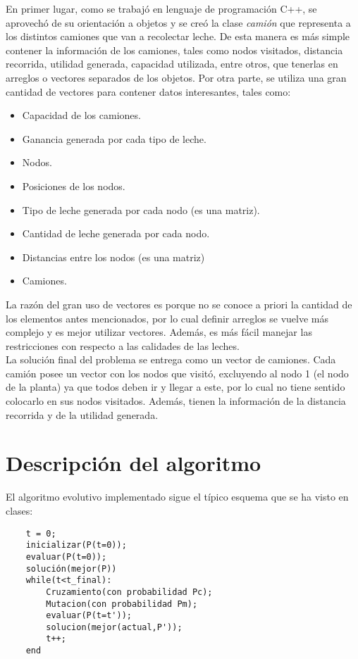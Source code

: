 \documentclass[letter, 10pt]{article}
\begin{document}
En primer lugar, como se trabajó en lenguaje de programación C++, se aprovechó de su orientación a objetos y se creó la clase \textit{camión} que representa a los distintos camiones que van a recolectar leche. De esta manera es más simple contener la información de los camiones, tales como nodos visitados, distancia recorrida, utilidad generada, capacidad utilizada, entre otros, que tenerlas en arreglos o vectores separados de los objetos. Por otra parte, se utiliza una gran cantidad de vectores para contener datos interesantes, tales como:

\begin{itemize}
    \item Capacidad de los camiones.
    \item Ganancia generada por cada tipo de leche.
    \item Nodos.
    \item Posiciones de los nodos.
    \item Tipo de leche generada por cada nodo (es una matriz).
    \item Cantidad de leche generada por cada nodo.
    \item Distancias entre los nodos (es una matriz)
    \item Camiones.
\end{itemize}

La razón del gran uso de vectores es porque no se conoce a priori la cantidad de los elementos antes mencionados, por lo cual definir arreglos se vuelve más complejo y es mejor utilizar vectores. Además, es más fácil manejar las restricciones con respecto a las calidades de las leches. \\

La solución final del problema se entrega como un vector de camiones. Cada camión posee un vector con los nodos que visitó, excluyendo al nodo 1 (el nodo de la planta) ya que todos deben ir y llegar a este, por lo cual no tiene sentido colocarlo en sus nodos visitados. Además, tienen la información de la distancia recorrida y de la utilidad generada. \\

\section{Descripci\'on del algoritmo}

El algoritmo evolutivo implementado sigue el típico esquema que se ha visto en clases:

\begin{lstlisting}
    t = 0;
    inicializar(P(t=0));
    evaluar(P(t=0));
    solución(mejor(P))
    while(t<t_final):
        Cruzamiento(con probabilidad Pc);
        Mutacion(con probabilidad Pm);
        evaluar(P(t=t'));
        solucion(mejor(actual,P'));
        t++;
    end
\end{lstlisting}
\end{document}
